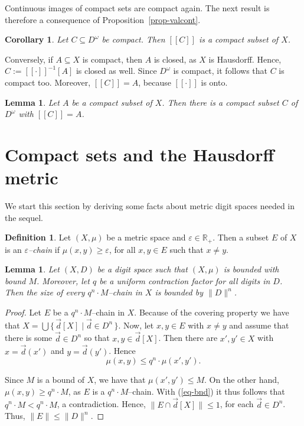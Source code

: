 \documentclass[microtype]{jloganal}
\theoremstyle{plain}
\newtheorem{lemma}[theorem]{Lemma}
\newtheorem{corollary}[theorem]{Corollary}
\theoremstyle{definition}
\newtheorem{definition}[theorem]{Definition}
\newcommand{\val}[1]{[\![#1]\!]}
\newcommand{\card}[1]{\mathopen\parallel #1 \mathclose\parallel}
\begin{document}
Continuous images of compact sets are compact again. The next result is therefore a consequence of Proposition~\ref{prop-valcont}.
\begin{corollary}\label{cor-cant-x}
Let $C \subseteq D^\omega$ be compact. Then $\val{C}$ is a compact subset of $X$.
\end{corollary}

Conversely, if $A \subseteq X$ is compact, then $A$ is closed, as $X$ is Hausdorff. Hence, $C := \val{\cdot}^{-1}[A]$ is closed as well. Since $D^\omega$ is compact, it follows that $C$ is compact too. Moreover, $\val{C} = A$, because $\val{\cdot}$ is onto.
\begin{lemma}\label{lem-x-cant}
Let $A$ be a compact subset of  $X$. Then there is a compact subset $C$ of $D^\omega$ with $\val{C} = A$.
\end{lemma}


\section{Compact sets and the Hausdorff metric}
\label{sec-compact-hausdorff}

We start this section by deriving some facts about metric digit spaces 
needed in the sequel.

\begin{definition}
Let $(X, \mu)$ be a metric space and $\varepsilon \in \mathbb{R}_+$. 
Then a subset $E$ of $X$ is an \emph{$\varepsilon$--chain} if 
$\mu(x,y) \ge \varepsilon$, for all $x, y \in E$ such that $x \not= y$.
\end{definition}

\begin{lemma}\label{lem-cbnd}
Let $(X, D)$ be a digit space such that $(X, \mu)$ is bounded with bound $M$. 
Moreover, let $q$ be a uniform contraction factor for all digits in $D$. 
Then the size of every $q^n \cdot M$--chain in $X$ is bounded by $\card{D}^n$. 
\end{lemma}
\begin{proof}
Let $E$ be a $q^n \cdot M$--chain in $X$. Because of the covering property 
we have that $X = \bigcup\{\, \vec{d}[X] \mid \vec{d} \in D^n \,\}$. Now, 
let $x, y \in E$ with $x \not= y$ and assume that there is some 
$\vec{d} \in D^n$ so that $x, y \in \vec{d}[X]$. Then there are $x', y' \in X$ 
with $x = \vec{d}(x')$ and $y = \vec{d}(y')$. Hence
\begin{equation}\label{eq-bnd}
 \mu(x,y) \le q^n \cdot \mu(x', y').
\end{equation}

Since $M$ is a bound of $X$, we have that $\mu(x', y') \le M$. On the other 
hand, $\mu(x,y) \ge q^n \cdot M$, as $E$ is a $q^n \cdot M$--chain. With 
(\ref{eq-bnd}) it thus follows that $q^n \cdot M < q^n \cdot M$, a 
contradiction. Hence, $\card{E \cap \vec{d}[X]} \le 1$, for each 
$\vec{d} \in D^n$. Thus, $\card{E} \le \card{D}^n$. 
\end{proof}
\end{document}

